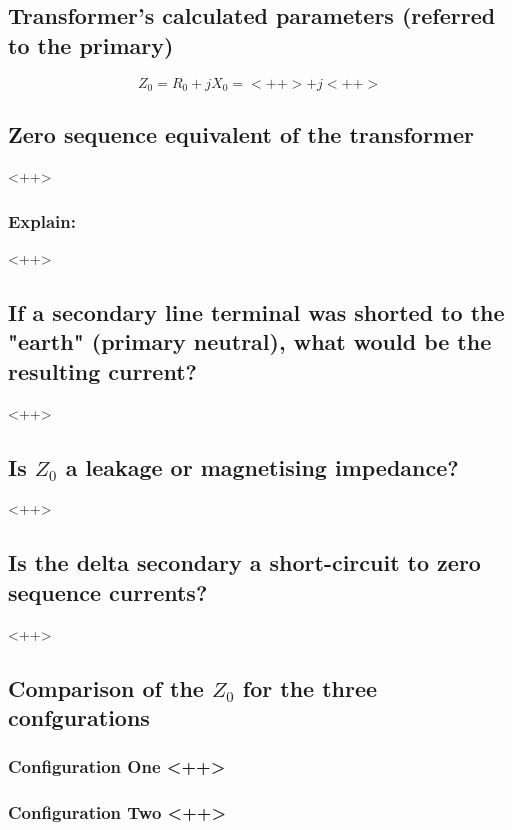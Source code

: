 \documentclass{article}
\begin{document}
\subsection{Transformer's calculated parameters (referred to the primary)} 

\begin{equation}
  Z _0 = R _0 + j X _0 = <++> + j <++>
\end{equation}

\subsection{Zero sequence equivalent of the transformer} 

<++>

\subsubsection{Explain:} 

<++>

\subsection{If a secondary line terminal was shorted to the "earth" (primary neutral), what would be the resulting current?} 

<++>

\subsection{Is $Z _0$ a leakage or magnetising impedance?} 

<++>

\subsection{Is the delta secondary a short-circuit to zero sequence currents?} 

<++>

\subsection{Comparison of the $Z _0$ for the three confgurations} 

\subsubsection{Configuration One <++>} 

\subsubsection{Configuration Two <++>} 
\end{document}
